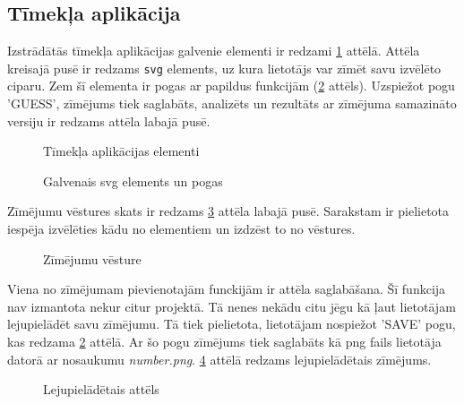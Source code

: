 \subsection{Tīmekļa aplikācija}
Izstrādātās tīmekļa aplikācijas galvenie elementi ir redzami \ref{orig:lapasElementi} attēlā. Attēla kreisajā pusē ir redzams \texttt{svg} elements, uz kura lietotājs var zīmēt savu izvēlēto ciparu. Zem šī elementa ir pogas ar papildus funkcijām (\ref{orig:svgElementi} attēls). Uzspiežot pogu 'GUESS', zīmējums tiek saglabāts, analizēts un rezultāts ar zīmējuma samazināto versiju ir redzams attēla labajā pusē.

\begin{figure}[H]
    \centering
    \caption{Tīmekļa aplikācijas elementi}
    \label{orig:lapasElementi}
\end{figure}

\begin{figure}[H]
    \centering
    \caption{Galvenais svg elements un pogas}
    \label{orig:svgElementi}
\end{figure}

\par Zīmējumu vēstures skats ir redzams \ref{orig:selection} attēla labajā pusē. Sarakstam ir pielietota iespēja izvēlēties kādu no elementiem un izdzēst to no vēstures.

\begin{figure}[H]
    \centering
    \caption{Zīmējumu vēsture}
    \label{orig:selection}
\end{figure}

\par Viena no zīmējumam pievienotajām funckijām ir attēla saglabāšana. Šī funkcija nav izmantota nekur citur projektā. Tā nenes nekādu citu jēgu kā ļaut lietotājam lejupielādēt savu zīmējumu. Tā tiek pielietota, lietotājam nospiežot 'SAVE' pogu, kas redzama \ref{orig:svgElementi} attēlā. Ar šo pogu zīmējums tiek saglabāts kā png fails lietotāja datorā ar nosaukumu \textit{number.png}. \ref{orig:downloadedFile} attēlā redzams lejupielādētais zīmējums.
\begin{figure}[H]
    \centering
    \caption{Lejupielādētais attēls}
    \label{orig:downloadedFile}
\end{figure}
